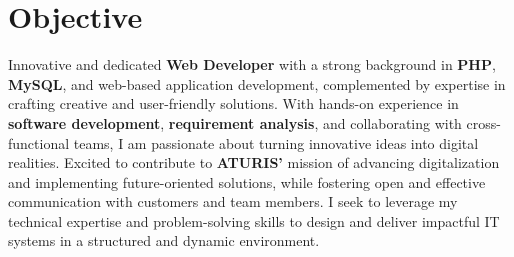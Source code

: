 \section{Objective}
Innovative and dedicated \textbf{Web Developer} with a strong background in \textbf{PHP}, \textbf{MySQL}, and web-based application development, complemented by expertise in crafting creative and user-friendly solutions. With hands-on experience in \textbf{software development}, \textbf{requirement analysis}, and collaborating with cross-functional teams, I am passionate about turning innovative ideas into digital realities. Excited to contribute to \textbf{ATURIS’} mission of advancing digitalization and implementing future-oriented solutions, while fostering open and effective communication with customers and team members. I seek to leverage my technical expertise and problem-solving skills to design and deliver impactful IT systems in a structured and dynamic environment.
